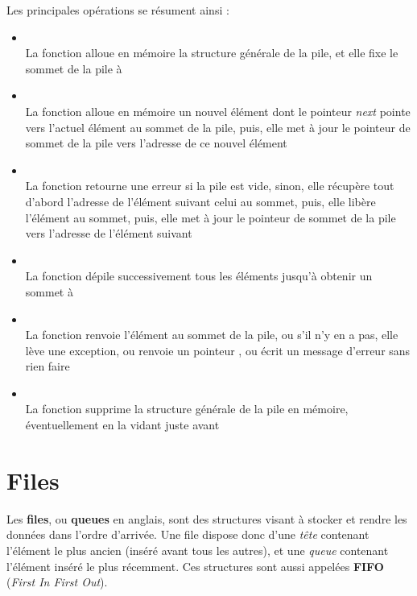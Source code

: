 \documentclass[11pt,a4paper]{article}
\begin{document}
\smallskip

Les principales opérations se résument ainsi :
\begin{itemize}
\item {}\\
      La fonction alloue en mémoire la structure générale de la pile, et elle fixe le sommet de la pile à 
\item {}\\
      La fonction alloue en mémoire un nouvel élément dont le pointeur \textit{next} pointe vers l'actuel élément au sommet de la pile, puis, elle met à jour le pointeur de sommet de la pile vers l'adresse de ce nouvel élément
\item {}\\
      La fonction retourne une erreur si la pile est vide, sinon, elle récupère tout d'abord l'adresse de l'élément suivant celui au sommet, puis, elle libère l'élément au sommet, puis, elle met à jour le pointeur de sommet de la pile vers l'adresse de l'élément suivant
\item {}\\
      La fonction dépile successivement tous les éléments jusqu'à obtenir un sommet à 
\item {}\\
      La fonction renvoie l'élément au sommet de la pile, ou s'il n'y en a pas, elle lève une exception, ou renvoie un pointeur , ou écrit un message d'erreur sans rien faire
\item {}\\
      La fonction supprime la structure générale de la pile en mémoire, éventuellement en la vidant juste avant
\end{itemize}


\newpage


\section{Files}

\bigskip

Les \textbf{files}, ou \textbf{queues} en anglais, sont des structures visant à stocker et rendre les données dans l'ordre d'arrivée.
Une file dispose donc d'une \textit{tête} contenant l'élément le plus ancien (inséré avant tous les autres), et une \textit{queue} contenant l'élément inséré le plus récemment.
Ces structures sont aussi appelées \textbf{FIFO} (\textit{First In First Out}).\\
\end{document}

